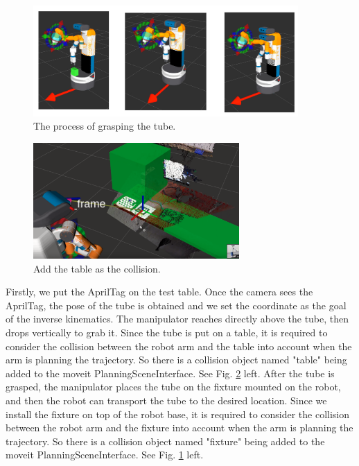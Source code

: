 \documentclass[12pt,draftclsnofoot,onecolumn]{IEEEtran}
\begin{document}
	\begin{figure}[htbp]  %
		\centering
		\includegraphics[width=0.9\textwidth]{img/rviz.jpg}
		\caption{
			The process of grasping the tube.
		}
		\label{rviz}
	\end{figure}
	\begin{figure}[htbp]  %
		\centering
		\includegraphics[width=0.7\textwidth]{img/rviz2.png}
		\caption{
			Add the table as the collision.
		}
		\label{table_coll}
	\end{figure}
	
	Firstly, we put the AprilTag on the test table. Once the camera sees the AprilTag, the pose of the tube is obtained and we set the coordinate
	as the goal of the inverse kinematics. The manipulator reaches directly above the tube, then drops vertically to grab it. 
	Since the tube is put on a table, it is required to consider the collision between the robot arm and the table into account when the arm is planning the trajectory. So there is a collision object named "table" being added to the moveit PlanningSceneInterface. See Fig. \ref{table_coll} left.
	After the tube is grasped, the manipulator places the tube on the fixture mounted on the robot,
	and then the robot can transport the tube to the desired location. 
	Since we install the fixture on top of the robot base, it is required to consider the collision between the robot arm and the fixture into account when the arm is planning the trajectory. So there is a collision object named "fixture" being added to the moveit PlanningSceneInterface. See Fig. \ref{rviz} left.
	
\end{document}
